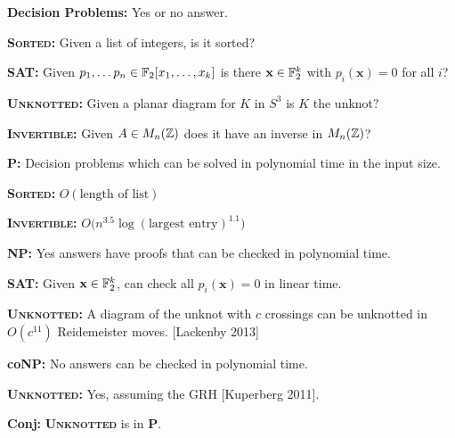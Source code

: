 \documentclass[aspect=4:3]{nmd/slide}
\newcommand{\alg}[1]{\textsc{\textbf{#1}}}
\newcommand{\x}{\mathbf{x}}
\begin{document}
\begin{frame}
  \textbf{Decision Problems:}  Yes or no answer.  
  
  \bigskip
  
  \alg{Sorted:} Given a list of integers, is it sorted?

  \medskip

  \alg{SAT:} Given $p_1, \ldots p_n \in {\mathbb F}_2[x_1, \ldots, x_k]$ is there $\x \in \F_2^k$ with $p_i(\x) = 0$ for all $i$? 

  \medskip

  \alg{Unknotted:}  Given a planar diagram for $K$ in $S^3$ is $K$ the unknot?

  \medskip

  \alg{Invertible:} Given $A \in M_n({\mathbb Z})$ does it have an inverse in $M_n({\mathbb Z})$?

  \vspace{1.5cm}

  \textbf{P:} Decision problems which can be solved in polynomial time in the input size.

  \smallskip 

  \quad \alg{Sorted:} $O(\mbox{length of list})$

  \smallskip 

  \quad \alg{Invertible:} $O\big(n^{3.5} \log(\mbox{largest entry})^{1.1}\big)$
\end{frame}

\begin{frame}
  \textbf{NP:}  Yes answers have proofs that can be checked in
  polynomial time.  
  
  \medskip 
  \alg{SAT:} Given $\x \in \F_2^k$, can check all $p_i(\x) = 0$ in linear time. 

  \medskip

  \alg{Unknotted:} A diagram of the unknot with $c$ crossings can be unknotted
   in $O(c^{11})$ Reidemeister moves.  [Lackenby 2013]

\vspace{1.5cm}

\textbf{coNP:}  No answers can be checked in polynomial time.

 \medskip
 \alg{Unknotted:}  Yes, assuming the GRH [Kuperberg 2011]. 

\vspace{1.5cm}

\textbf{Conj:}  \alg{Unknotted} is in \textbf{P}.  

\end{frame}
\end{document}
